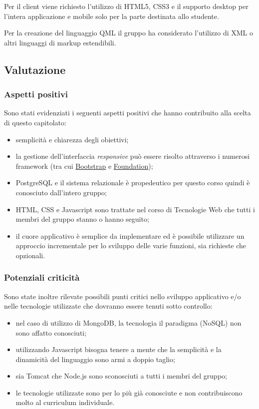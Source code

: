 \documentclass[12pt,a4paper]{article}
\begin{document}
Per il client viene richiesto l'utilizzo di HTML5, CSS3 e il supporto desktop per l'intera applicazione e mobile
solo per la parte destinata allo studente.

Per la creazione del linguaggio QML il gruppo ha considerato l'utilizzo di XML o altri linguaggi di markup
estendibili.

\subsection{Valutazione}
\subsubsection{Aspetti positivi}

Sono stati evidenziati i seguenti aspetti positivi che hanno contribuito alla scelta di
questo capitolato:

\begin{itemize}
\item semplicità e chiarezza degli obiettivi;
\item la gestione dell'interfaccia \textit{responsive} può essere risolto attraverso i numerosi
    framework (tra cui \href{http://getbootstrap.com}{Bootstrap} e \href{http://foundation.zurb.com}{Foundation});
\item PostgreSQL e il sistema relazionale è propedeutico per questo corso quindi è conosciuto dall'intero gruppo;
\item HTML, CSS e Javascript sono trattate nel corso di Tecnologie Web che tutti i membri del gruppo stanno o hanno
seguito;
\item il cuore applicativo è semplice da implementare ed è possibile utilizzare un approccio incrementale
per lo sviluppo delle varie funzioni, sia richieste che opzionali.
\end{itemize}

\subsubsection{Potenziali criticità}

Sono state inoltre rilevate possibili punti critici nello sviluppo applicativo e/o nelle tecnologie utilizzate
che dovranno essere tenuti sotto controllo:

\begin{itemize}
\item nel caso di utilizzo di MongoDB, la tecnologia il paradigma (NoSQL) non sono affatto conosciuti;
\item utilizzando Javascript bisogna tenere a mente che la semplicità e la dinamicità del linguaggio
sono armi a doppio taglio;
\item sia Tomcat che Node.js sono sconosciuti a tutti i membri del gruppo;
\item le tecnologie utilizzate sono per lo più già conosciute e non contribuiscono molto
al curriculum individuale.
\end{itemize}
\end{document}
